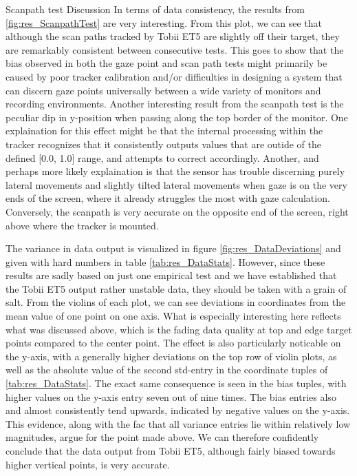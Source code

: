 Scanpath test Discussion
In terms of data consistency, the results from \ref{fig:res_ScanpathTest} are very interesting. From this plot, we can see that although the scan paths tracked by Tobii ET5 are slightly off their target, they are remarkably consistent between consecutive tests. This goes to show that the bias observed in both the gaze point and scan path tests might primarily be caused by poor tracker calibration and/or difficulties in designing a system that can discern gaze points universally between a wide variety of monitors and recording environments. Another interesting result from the scanpath test is the peculiar dip in y-position when passing along the top border of the monitor. One explaination for this effect might be that the internal processing within the tracker recognizes that it consistently outputs values that are outide of the defined [0.0, 1.0] range, and attempts to correct accordingly. Another, and perhaps more likely explaination is that the sensor has trouble discerning purely lateral movements and slightly tilted lateral movements when gaze is on the very ends of the screen, where it already struggles the most with gaze calculation. Conversely, the scanpath is very accurate on the opposite end of the screen, right above where the tracker is mounted.

The variance in data output is visualized in figure \ref{fig:res_DataDeviations} and given with hard numbers in table \ref{tab:res_DataStats}. However, since these results are sadly based on just one empirical test and we have established that the Tobii ET5 output rather unstable data, they should be taken with a grain of salt. From the violins of each plot, we can see deviations in coordinates from the mean value of one point on one axis. What is especially interesting here reflects what was discussed above, which is the fading data quality at top and edge target points compared to the center point. The effect is also particularly noticable on the y-axis, with a generally higher deviations on the top row of violin plots, as well as the absolute value of the second std-entry in the coordinate tuples of \ref{tab:res_DataStats}. The exact same consequence is seen in the bias tuples, with higher values on the y-axis entry seven out of nine times. The bias entries also and almost consistently tend upwards, indicated by negative values on the y-axis. This evidence, along with the fac that all variance entries lie within relatively low magnitudes, argue for the point made above. We can therefore confidently conclude that the data output from Tobii ET5, although fairly biased towards higher vertical points, is very accurate.

